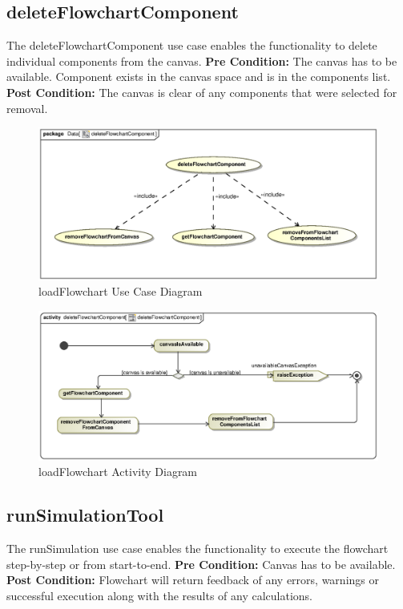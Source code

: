 \documentclass[11pt,a4paper,titlepage]{article}
\begin{document}
\newpage
\subsection{deleteFlowchartComponent}
The deleteFlowchartComponent use case enables the functionality to delete individual components from the canvas.\newline\newline
\textbf{Pre Condition:} The canvas has to be available. Component exists in the canvas space and is in the components list.\newline\newline
\textbf{Post Condition:} The canvas is clear of any components that were selected for removal.

\begin{figure}[H]
  \centering
\includegraphics[width=500px]{deleteFlowchartComponentUseCase.eps}
\caption{loadFlowchart Use Case Diagram}
\end{figure}

\begin{figure}[H]
  \centering
\includegraphics[width=500px]{deleteFlowchartComponentActivity.eps}
\caption{loadFlowchart Activity Diagram}
\end{figure}

\newpage
\subsection{runSimulationTool}
The runSimulation use case enables the functionality to execute the flowchart step-by-step or from start-to-end.\newline\newline
\textbf{Pre Condition:} Canvas has to be available.\newline\newline
\textbf{Post Condition:} Flowchart will return feedback of any errors, warnings or successful execution along with the results of any calculations.
\end{document}
